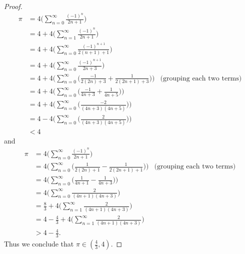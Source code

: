 \begin{proof}
    \begin{align*}
        \pi & = 4 \bigg(\sum_{n = 0}^\infty \frac{(-1)^n}{2n + 1}\bigg)                                                                             \\
            & = 4 + 4 \bigg(\sum_{n = 1}^\infty \frac{(-1)^n}{2n + 1}\bigg)                                                                         \\
            & = 4 + 4 \bigg(\sum_{n = 0}^\infty \frac{(-1)^{n + 1}}{2(n + 1) + 1}\bigg)                                                             \\
            & = 4 + 4 \bigg(\sum_{n = 0}^\infty \frac{(-1)^{n + 1}}{2n + 3}\bigg)                                                                   \\
            & = 4 + 4 \Bigg(\sum_{n = 0}^\infty \bigg(\frac{-1}{2(2n) + 3} + \frac{1}{2(2n + 1) + 3}\bigg)\Bigg) & \text{(grouping each two terms)} \\
            & = 4 + 4 \Bigg(\sum_{n = 0}^\infty \bigg(\frac{-1}{4n + 3} + \frac{1}{4n + 5}\bigg)\Bigg)                                              \\
            & = 4 + 4 \Bigg(\sum_{n = 0}^\infty \bigg(\frac{-2}{(4n + 3)(4n + 5)}\bigg)\Bigg)                                                       \\
            & = 4 - 4 \Bigg(\sum_{n = 0}^\infty \bigg(\frac{2}{(4n + 3)(4n + 5)}\bigg)\Bigg)                                                        \\
            & < 4
    \end{align*}
    and
    \begin{align*}
        \pi & = 4 \bigg(\sum_{n = 0}^\infty \frac{(-1)^n}{2n + 1}\bigg)                                                                        \\
            & = 4 \Bigg(\sum_{n = 0}^\infty \bigg(\frac{1}{2(2n) + 1} - \frac{1}{2(2n + 1) + 1}\bigg)\Bigg) & \text{(grouping each two terms)} \\
            & = 4 \Bigg(\sum_{n = 0}^\infty \bigg(\frac{1}{4n + 1} - \frac{1}{4n + 3}\bigg)\Bigg)                                              \\
            & = 4 \bigg(\sum_{n = 0}^\infty \frac{2}{(4n + 1)(4n + 3)}\bigg)                                                                   \\
            & = \frac{8}{3} + 4 \bigg(\sum_{n = 1}^\infty \frac{2}{(4n + 1)(4n + 3)}\bigg)                                                     \\
            & = 4 - \frac{4}{3} + 4 \bigg(\sum_{n = 1}^\infty \frac{2}{(4n + 1)(4n + 3)}\bigg)                                                 \\
            & > 4 - \frac{4}{3}.
    \end{align*}
    Thus we conclude that \(\pi \in (\frac{4}{3}, 4)\).
\end{proof}

